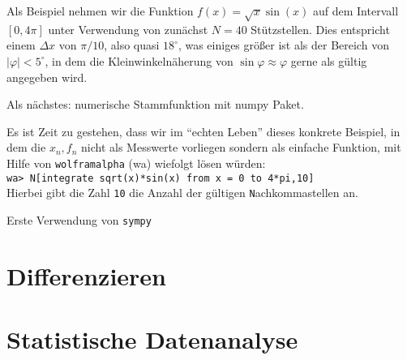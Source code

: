 Als Beispiel nehmen wir die Funktion $f(x) = \sqrt{x}\sin(x)$ auf dem Intervall $[0,4\pi]$ unter Verwendung von zunächst $N = 40$ Stützstellen. Dies entspricht einem $\Delta x$ von $\pi/10$, also quasi $18^\circ$, was einiges größer ist als der Bereich  von $\vert \varphi \vert < 5^\circ$, in dem die Kleinwinkelnäherung von $\sin\varphi \approx \varphi$ gerne als gültig angegeben wird. 
%



% 
% 
% 
% 
% 

Als nächstes: numerische Stammfunktion mit numpy Paket.



Es ist Zeit zu gestehen, dass wir im ``echten Leben'' dieses konkrete  Beispiel, in dem die $x_n,f_n$ nicht als Messwerte vorliegen sondern als einfache Funktion, mit Hilfe von \texttt{wolframalpha} (wa) wiefolgt lösen würden:\vspace*{2mm}\\
\texttt{wa> N[integrate sqrt(x)*sin(x) from x = 0 to 4*pi,10]} \vspace*{2mm}\\
Hierbei gibt die Zahl \texttt{10} die Anzahl der gültigen \texttt{N}achkommastellen an. 

Erste Verwendung von \texttt{sympy}


\section{Differenzieren}

\section{Statistische Datenanalyse}
